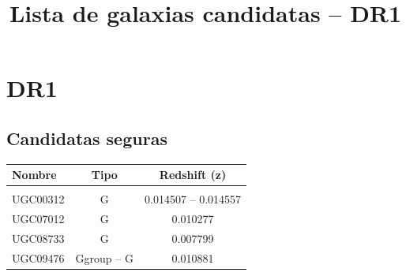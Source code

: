 \documentclass[9pt]{revtex4-1}
\title{Lista de galaxias candidatas -- DR1}
\begin{document}
\maketitle

\section{DR1}
\subsection{Candidatas seguras}


\begin{center}
\begin{tabular}{ l c c }
Nombre & Tipo & Redshift (z) \\
\hline
\hline \\
UGC00312 & G & 0.014507 -- 0.014557 \\
UGC07012 & G & 0.010277 \\
UGC08733 & G & 0.007799 \\
UGC09476 & Ggroup -- G & 0.010881 \\
\end{tabular}
\end{center}
\end{document}
